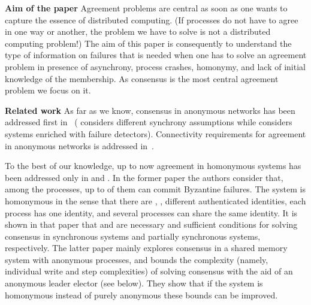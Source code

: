 \documentclass[10pt, conference, compsocconf]{IEEEtran}
\newcommand{\tightparagraph}[1]{\smallskip \noindent \textbf{#1} \hspace{1ex}}
\begin{document}
\tightparagraph{Aim of the paper}
Agreement problems are  central as soon as one wants  to capture the essence
of distributed computing. (If processes do not have to agree in one way
or another,  the problem we  have to solve  is not a  distributed computing
problem!)  
The  aim  of  this  paper   is  consequently  to  understand  the  type  of
information  on failures   that  is needed  when   one has    to solve   an
agreement  problem in  presence of asynchrony, process crashes,  
homonymy, and lack of initial knowledge of the membership. 
As consensus is the most central agreement problem we focus on it. 



\tightparagraph{Related work}
As far as we know, consensus in anonymous networks has been addressed 
first in~\cite{DBLP:conf/wdag/BonnetR09,DFT09} 
(\cite{DFT09} considers different synchrony assumptions while 
\cite{DBLP:conf/wdag/BonnetR09} considers systems enriched with
failure detectors). Connectivity requirements for agreement 
in anonymous networks is addressed in~\cite{GT07}. 


To the best of  our knowledge, up to now agreement  in  homonymous systems 
has been addressed  only  in \cite{DFGKRT11} and \cite{janus-opodis2011}.
In the former paper the  authors consider
that,  among the   processes,  up to   of  them can  commit Byzantine
failures.  The system is homonymous in the sense that there are , 
,  different authenticated identities,  each process 
has one identity, and several processes can share the same identity. 
It is  shown in that paper that    and   
are   necessary and sufficient conditions for solving consensus in synchronous 
systems and  partially synchronous systems, respectively.
The latter paper \cite{janus-opodis2011} mainly explores consensus
in a shared memory system with anonymous processes, and bounds
the complexity (namely, individual write and step complexities) of
solving consensus with the aid of an anonymous leader elector  
(see below).
They show that if the system is homonymous instead of purely anonymous
these bounds can be improved.
\end{document}
